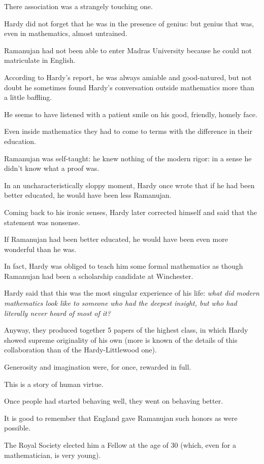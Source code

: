 \documentclass{article}
\numberwithin{equation}{section}
\begin{document}
%
There association was a strangely touching one.

Hardy did not forget that he was in the presence of genius: but genius that was, even in mathematics, almost untrained.

Ramanujan had not been able to enter Madras University because he could not matriculate in English.

According to Hardy's report, he was always amiable and good-natured, but not doubt he sometimes found Hardy's conversation outside mathematics more than a little baffling.

He seems to have listened with a patient smile on his good, friendly, homely face.

Even inside mathematics they had to come to terms with the difference in their education.

Ramanujan was self-taught: he knew nothing of the modern rigor: in a sense he didn't know what a proof was.

In an uncharacteristically sloppy moment, Hardy once wrote that if he had been better educated, he would have been less Ramanujan.

Coming back to his ironic senses, Hardy later corrected himself and said that the statement was nonsense.

If Ramanujan had been better educated, he would have been even more wonderful than he was.

In fact, Hardy was obliged to teach him some formal mathematics as though Ramanujan had been a scholarship candidate at Winchester.

Hardy said that this was the most singular experience of his life: \textit{what did modern mathematics look like to someone who had the deepest insight, but who had literally never heard of most of it?}

%
Anyway, they produced together 5 papers of the highest class, in which Hardy showed supreme originality of his own (more is known of the details of this collaboration than of the Hardy-Littlewood one).

Generosity and imagination were, for once, rewarded in full.

%
This is a story of human virtue.

Once people had started behaving well, they went on behaving better.

It is good to remember that England gave Ramanujan such honors as were possible.

The Royal Society elected him a Fellow at the age of 30 (which, even for a mathematician, is very young).
\end{document}
